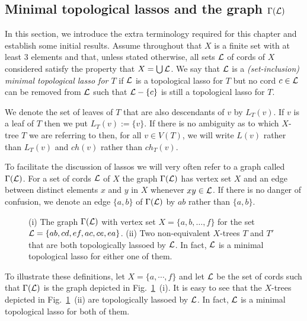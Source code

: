 \subsection{Minimal topological lassos and the graph $\Gamma({\mathcal L})$}
\label{sec:terminology}

In this section, we introduce the extra terminology required for this chapter
and establish some initial results.  Assume throughout that $X$ is a finite
set with at least 3 elements and that, unless stated otherwise, all sets ${\mathcal L}$
of cords of $X$ considered satisfy the property that $X=\bigcup {\mathcal L}$.  We say
that ${\mathcal L}$ is a {\em (set-inclusion) minimal topological lasso for $T$} if
${\mathcal L}$ is a topological lasso for $T$ but no cord $c \in {\mathcal L}$ can be removed
from ${\mathcal L}$ such that ${\mathcal L}-\{c\}$ is still a topological lasso for $T$.

We denote the set of leaves of $T$ that are also descendants of $v$ by
$L_T(v)$. If $v$ is a leaf of $T$ then we put $L_T(v):=\{v\}$. If there is no
ambiguity as to which $X$-tree $T$ we are referring to then, for all $v\in
V(T)$, we will write $L(v)$ rather than $L_T(v)$ and $ch(v)$ rather than
$ch_T(v)$.

To facilitate the discussion of lassos we will very often refer to a graph
called $\Gamma({\mathcal L})$.  For a set of cords ${\mathcal L}$ of $X$ the graph $\Gamma({\mathcal L})$
has vertex set $X$ and an edge between distinct elements $x$ and $y$ in $X$
whenever $xy \in {\mathcal L}$.  If there is no danger of confusion, we denote an edge
$\{a,b\}$ of $\Gamma({\mathcal L})$ by $ab$ rather than $\{a,b\}$.

\begin{figure}[h]
  \begin{center}
    
  \end{center}
  \caption{(i) The graph $\Gamma({\mathcal L})$ with vertex set $X=\{a,b,\ldots,f\}$
    for the set ${\mathcal L}=\{ab,cd,ef,ac,ce,ea\}$. (ii) Two non-equivalent $X$-trees
    $T$ and $T'$ that are both topologically lassoed by ${\mathcal L}$. In fact, ${\mathcal L}$
    is a minimal topological lasso for either one of them.}
  \label{fig:block-graph-motivation}
\end{figure}

To illustrate these definitions, let $X=\{a,\cdots,f\}$ and let ${\mathcal L}$ be the
set of cords such that $\Gamma({\mathcal L})$ is the graph depicted in
Fig.~\ref{fig:block-graph-motivation}~(i).  It is easy to see that the
$X$-trees depicted in Fig.~\ref{fig:block-graph-motivation}~(ii) are
topologically lassoed by ${\mathcal L}$. In fact, ${\mathcal L}$ is a minimal topological lasso
for both of them.


